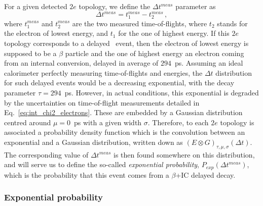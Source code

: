 For a given detected $2e$ topology, we define the $\Delta t^{meas}$ parameter as
\begin{equation}
  \Delta t^{meas} = t_{1}^{meas}-t_{2}^{meas}\,,
  \label{eq:time_diff}
\end{equation}
where $t_{1}^{meas}$ and $t_{2}^{meas}$ are the two measured time-of-flights, where $t_{2}$ stands for the electron of lowest energy, and $t_{1}$ for the one of highest energy.
If this $2e$ topology corresponds to a delayed \Tl\ event, then the electron of lowest energy is supposed to be a $\beta$ particle and the one of highest energy an electron coming from an internal conversion, delayed in average of $294$~ps.
Assuming an ideal calorimeter perfectly measuring time-of-flights and energies, the $\Delta t$ distribution for such delayed events would be a decreasing exponential, with the decay parameter ${\tau=294}$~ps.
However, in actual conditions, this exponential is degraded by the uncertainties on time-of-flight measurements detailed in Eq.~\eqref{eq:int_chi2_electrons}.
These are embedded by a Gaussian distribution centred around ${\mu=0}$~ps with a given width $\sigma$.
Therefore, to each $2e$ topology is associated a probability density function which is the convolution between an exponential and a Gaussian distribution, written down as ${(E \otimes G)_{\tau,\mu,\sigma}(\Delta t)}$.
The corresponding value of $\Delta t^{meas}$ is then found somewhere on this distribution, and will serve us to define the so-called \emph{exponential probability}, $P_{exp}(\Delta t^{meas})$, which is the probability that this event comes from a $\beta$+IC delayed decay.


\subsubsection{Exponential probability}

